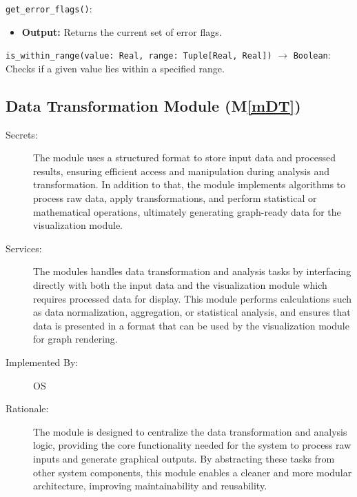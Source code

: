\documentclass[12pt, titlepage]{article}
\newcommand{\mref}[1]{M\ref{#1}}
\begin{document}
\begin{description}
  \texttt{get\_error\_flags()}:
  \item
  \begin{itemize}
    \item \textbf{Output:} Returns the current set of error flags.
  \end{itemize}

  \item[Local Function:]
  \item
  \texttt{is\_within\_range(value: Real, range: Tuple[Real, Real])} $\to$ \texttt{Boolean}:\\
  Checks if a given value lies within a specified range.
\end{description}

\subsection{Data Transformation Module (\mref{mDT})}
\begin{description}
  \item[Secrets:] The module uses a structured format to store input data and processed results, ensuring
  efficient access and manipulation during analysis and transformation. In addition to that, the module implements
  algorithms to process raw data, apply transformations, and perform statistical or mathematical operations,
  ultimately generating graph-ready data for the visualization module.
  \item[Services:] The modules handles data transformation and analysis tasks by interfacing directly with both 
  the input data and the visualization module which requires processed data for display. This module performs 
  calculations such as data normalization, aggregation, or statistical analysis, and ensures that data is presented 
  in a format that can be used by the visualization module for graph rendering.
  \item[Implemented By:] OS
  \item[Rationale:] The module is designed to centralize the data transformation and analysis logic, providing the core 
  functionality needed for the system to process raw inputs and generate graphical outputs. By abstracting these tasks 
  from other system components, this module enables a cleaner and more modular architecture, improving maintainability 
  and reusability.
\end{description}
\end{document}
